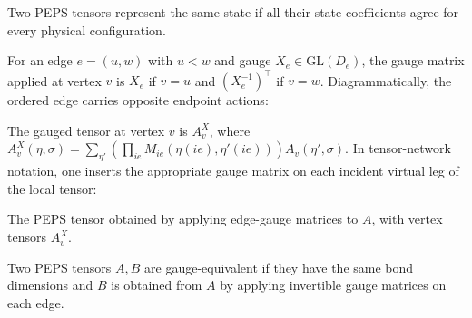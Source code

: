 \begin{definition}
    \label{def:peps_same_state}
    \leanok
    Two PEPS tensors represent the same state if all their state coefficients
    agree for every physical configuration.
\end{definition}

\begin{definition}%
    \label{def:edgeGaugeAt}
    \leanok
    For an edge $e = (u,w)$ with $u < w$ and gauge $X_e \in \mathrm{GL}(D_e)$,
    the gauge matrix applied at vertex $v$ is $X_e$ if $v = u$ and
    $(X_e^{-1})^\top$ if $v = w$.
    Diagrammatically, the ordered edge carries opposite endpoint actions:
    \begin{center}
        \TNPEPSEdgeGaugeOrientation
    \end{center}
\end{definition}

\begin{definition}%
    \label{def:gaugeVertex}
    \leanok
    The gauged tensor at vertex $v$ is $A^X_v$, where
    $A^X_v(\eta, \sigma)
        = \sum_{\eta'} (\prod_{ie} M_{ie}(\eta(ie), \eta'(ie)))
        A_v(\eta', \sigma)$.
    In tensor-network notation, one inserts the appropriate gauge matrix on
    each incident virtual leg of the local tensor:
    \begin{center}
        \TNPEPSGaugeVertexAction
    \end{center}
\end{definition}

\begin{definition}%
    \label{def:applyGauge}
    \leanok
    The PEPS tensor obtained by applying edge-gauge matrices to $A$, with
    vertex tensors $A^X_v$.
\end{definition}

\begin{definition}%
    \label{def:GaugeEquivPEPS}
    \leanok
    Two PEPS tensors $A, B$ are gauge-equivalent if they have the same bond
    dimensions and $B$ is obtained from $A$ by applying invertible gauge
    matrices on each edge.
\end{definition}

